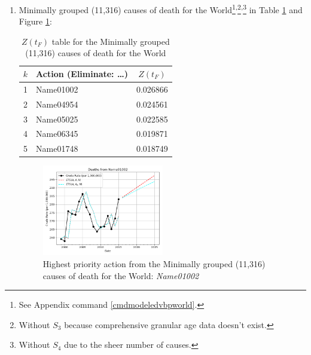 \documentclass[10pt, a4paper, twocolumn]{IEEEconf}
\begin{document}
\begin{enumerate}
  \item Minimally grouped (11,316) causes of death for the World\cite{whomortality}\footnote{See Appendix command \ref{cmdmodeledvbpworld}.}\textsuperscript{,}\footnote{\label{no_s3}Without $S_3$ because comprehensive granular age data doesn't exist.}\textsuperscript{,}\footnote{Without $S_4$ due to the sheer number of causes.} in Table \ref{table:ztable8} and Figure \ref{fig:k8}:
    \begin{table}[H]
      \centering
      \begin{tabular}{clc}
        \toprule
          $k$ & Action (Eliminate: \ldots) & $Z(t_F)$ \\
        \midrule
          1   & Name01002 & 0.026866 \\
          2   & Name04954 & 0.024561 \\
          3   & Name05025 & 0.022585 \\
          4   & Name06345 & 0.019871 \\
          5   & Name01748 & 0.018749 \\
        \bottomrule
      \end{tabular}
      \caption{$Z(t_F)$ table for the Minimally grouped (11,316) causes of death for the World}
      \label{table:ztable8}
    \end{table}
    \begin{figure}[H]
      \centering
      \includegraphics[width=0.5\textwidth]{results/WORLD_ICD10_MINIMALLY_GROUPED/Name01002_ets.png}
      \caption{Highest priority action from the Minimally grouped (11,316) causes of death for the World: \textit{Name01002}}\label{fig:k8}
    \end{figure}
  

\end{enumerate}
\end{document}
